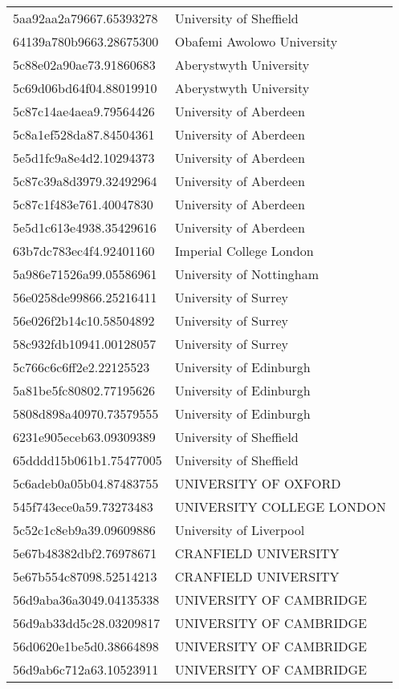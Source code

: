 \begin{tabular}{ll}
5aa92aa2a79667.65393278 & University of Sheffield \\
64139a780b9663.28675300 & Obafemi Awolowo University \\
5c88e02a90ae73.91860683 & Aberystwyth University \\
5c69d06bd64f04.88019910 & Aberystwyth University \\
5c87c14ae4aea9.79564426 & University of Aberdeen \\
5c8a1ef528da87.84504361 & University of Aberdeen \\
5e5d1fc9a8e4d2.10294373 & University of Aberdeen \\
5c87c39a8d3979.32492964 & University of Aberdeen \\
5c87c1f483e761.40047830 & University of Aberdeen \\
5e5d1c613e4938.35429616 & University of Aberdeen \\
63b7dc783ec4f4.92401160 & Imperial College London \\
5a986e71526a99.05586961 & University of Nottingham \\
56e0258de99866.25216411 & University of Surrey \\
56e026f2b14c10.58504892 & University of Surrey \\
58c932fdb10941.00128057 & University of Surrey \\
5c766c6c6ff2e2.22125523 & University of Edinburgh \\
5a81be5fc80802.77195626 & University of Edinburgh \\
5808d898a40970.73579555 & University of Edinburgh \\
6231e905eceb63.09309389 & University of Sheffield \\
65dddd15b061b1.75477005 & University of Sheffield \\
5c6adeb0a05b04.87483755 & UNIVERSITY OF OXFORD \\
545f743ece0a59.73273483 & UNIVERSITY COLLEGE LONDON \\
5c52c1c8eb9a39.09609886 & University of Liverpool \\
5e67b48382dbf2.76978671 & CRANFIELD UNIVERSITY \\
5e67b554c87098.52514213 & CRANFIELD UNIVERSITY \\
56d9aba36a3049.04135338 & UNIVERSITY OF CAMBRIDGE \\
56d9ab33dd5c28.03209817 & UNIVERSITY OF CAMBRIDGE \\
56d0620e1be5d0.38664898 & UNIVERSITY OF CAMBRIDGE \\
56d9ab6c712a63.10523911 & UNIVERSITY OF CAMBRIDGE \\

\end{tabular}
